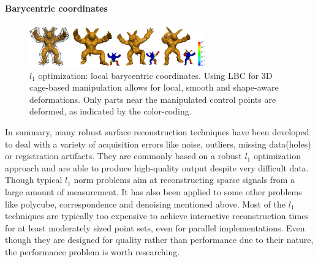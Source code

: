 \paragraph{Barycentric coordinates}

\begin{figure}[ht]
  \centering
  \includegraphics[width=3in]{images/LBC_L1}
  \caption{$l_1$ optimization: local barycentric coordinates\cite{}. Using LBC for 3D cage-based manipulation allows for local, smooth and shape-aware deformations. Only parts near the manipulated control points are deformed, as indicated by the color-coding.}
\end{figure}

In summary, many robust surface reconstruction techniques have been developed to deal with a variety of acquisition errors like noise, outliers, missing data(holes) or registration artifacts. They are commonly based on a robust $l_1$ optimization approach and are able to produce high-quality output despite very difficult data. Though typical $l_1$ norm problems aim at reconstructing sparse signals from a large amount of measurement. It has also been applied to some other problems like polycube, correspondence and denoising mentioned above. Most of the $l_1$ techniques are typically too expensive to achieve interactive reconstruction times for at least moderately sized point sets, even for parallel implementations. Even though they are designed for quality rather than performance due to their nature, the performance problem is worth researching. 